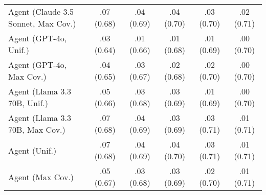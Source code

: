 \begin{table}[h!]
\begin{tabular}{lccccc}
    Agent (Claude 3.5 Sonnet, Max Cov.) & .07 {\small (0.68)} & \cellcolor{bronze!30}.04 {\small (0.69)} & \cellcolor{bronze!30}.04 {\small (0.70)} & .03 {\small (0.70)} & \cellcolor{silver!30}.02 {\small (0.71)} \\
    Agent (GPT-4o, Unif.) & .03 {\small (0.64)} & .01 {\small (0.66)} & .01 {\small (0.68)} & .01 {\small (0.69)} & .00 {\small (0.70)} \\
    Agent (GPT-4o, Max Cov.) & .04 {\small (0.65)} & .03 {\small (0.67)} & .02 {\small (0.68)} & .02 {\small (0.70)} & .00 {\small (0.70)} \\
    Agent (Llama 3.3 70B, Unif.) & .05 {\small (0.66)} & .03 {\small (0.68)} & .03 {\small (0.69)} & .01 {\small (0.69)} & .00 {\small (0.70)} \\
    Agent (Llama 3.3 70B, Max Cov.) & \cellcolor{bronze!30}.07 {\small (0.68)} & .04 {\small (0.69)} & .03 {\small (0.69)} & \cellcolor{bronze!30}.03 {\small (0.71)} & \cellcolor{bronze!30}.01 {\small (0.71)} \\
    Agent (Unif.) & .07 {\small (0.68)} & .04 {\small (0.69)} & .04 {\small (0.70)} & \cellcolor{bronze!30}.03 {\small (0.71)} & .01 {\small (0.71)} \\
    Agent (Max Cov.) & .05 {\small (0.67)} & .03 {\small (0.68)} & .03 {\small (0.69)} & .02 {\small (0.70)} & .01 {\small (0.71)} \\
    \bottomrule
    \end{tabular}
\end{table}